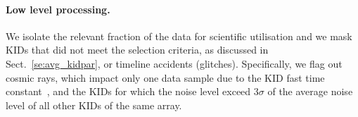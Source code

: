 \paragraph{Low level processing.}
\label{se:ll_proc}
We isolate the relevant fraction of the data for scientific
utilisation and {\lp we mask KIDs that did not meet the selection criteria, as
discussed in Sect.~\ref{se:avg_kidpar},} or
timeline accidents (glitches). Specifically, we flag out cosmic rays,
which impact only one data sample due to the KID fast time
constant~\citep{Catalano2014}, %
and the KIDs for which the noise level exceed $3\sigma$ of the average
noise level of all other KIDs of the same array.  
%
%

